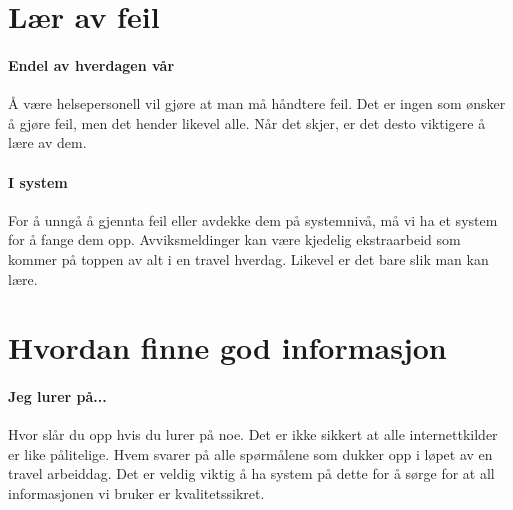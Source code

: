 		\section{Lær av feil}
			\paragraph{Endel av hverdagen vår\\}
				Å være helsepersonell vil gjøre at man må håndtere feil. Det er ingen som ønsker å gjøre feil, men det hender likevel alle. Når det skjer, er det desto viktigere å lære av dem.
			\paragraph{I system\\}
				For å unngå å gjennta feil eller avdekke dem på systemnivå, må vi ha et system for å fange dem opp. Avviksmeldinger kan være kjedelig ekstraarbeid som kommer på toppen av alt i en travel hverdag. Likevel er det bare slik man kan lære.
		\section{Hvordan finne god informasjon}
			\paragraph{Jeg lurer på...\\}
				Hvor slår du opp hvis du lurer på noe. Det er ikke sikkert at alle internettkilder er like pålitelige. Hvem svarer på alle spørmålene som dukker opp i løpet av en travel arbeiddag. Det er veldig viktig å ha system på dette for å sørge for at all informasjonen vi bruker er kvalitetssikret. 
